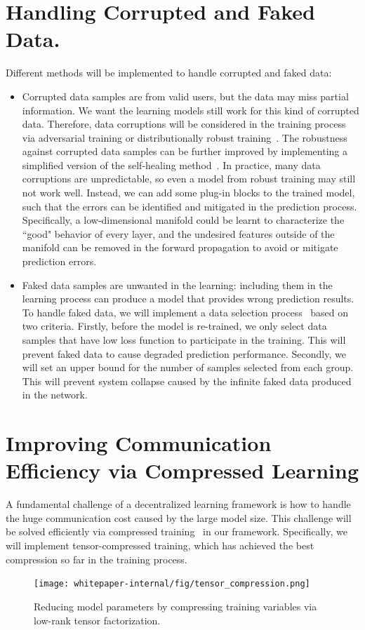 \documentclass[11pt,letterpaper]{article}
\begin{document}
\section{Handling Corrupted and Faked Data.}
Different methods will be implemented to handle corrupted and faked data:
\begin{itemize}
    \item Corrupted data samples are from valid users, but the data may miss partial information. We want the learning models still work for this kind of corrupted data. Therefore, data corruptions will be considered in the training process via adversarial training or distributionally robust training~\cite{sattler2019robust}. The robustness against corrupted data samples can be further improved by implementing a simplified version of the self-healing method~\cite{chen2022self}. In practice, many data corruptions are unpredictable, so even a model from robust training may still not work well. Instead, we can add some plug-in blocks to the trained model, such that the errors can be identified and mitigated in the prediction process. Specifically, a low-dimensional manifold could be learnt to characterize the ``good" behavior of every layer, and the undesired features outside of the manifold can be removed in the forward propagation to avoid or mitigate prediction errors.
    
    \item Faked data samples are unwanted in the learning: including them in the learning process can produce a model that provides wrong prediction results. To handle faked data, we will implement a data selection process~\cite{roh2021sample} based on two criteria. Firstly, before the model is re-trained, we only select data samples that have low loss function to participate in the training. This will prevent faked data to cause degraded prediction performance. Secondly, we will set an upper bound for the number of samples selected from each group. This will prevent system collapse caused by the infinite faked data produced in the network. 
\end{itemize}


\section{Improving Communication Efficiency via Compressed Learning}

A fundamental challenge of a decentralized learning framework is how to handle the huge communication cost caused by the large model size. This challenge will be solved efficiently via compressed training~\cite{hawkins2022towards,hawkins2021bayesian} in our framework. Specifically, we will implement tensor-compressed training, which has achieved the best compression so far in the training process.
\begin{figure}[t]
\centering
	\texttt{[image: whitepaper-internal/fig/tensor\_compression.png]}
\caption{Reducing model parameters by compressing training variables via low-rank tensor factorization. } 
\label{fig:aws_overview}
\end{figure}
\end{document}
